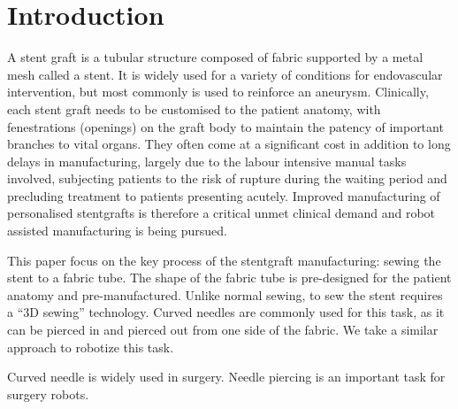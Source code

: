 \section{Introduction}


A stent graft is a tubular structure composed of fabric supported by a metal mesh called a stent. It is widely used for a variety of conditions for endovascular intervention, but most commonly is used to reinforce an aneurysm.
Clinically, each stent graft needs to be customised to the patient anatomy, with fenestrations (openings) on the graft body to maintain the patency of important branches to vital organs. They often come at a significant cost in addition to long delays in manufacturing, largely due to the labour intensive manual tasks involved, subjecting patients to the risk of rupture during the waiting period and precluding treatment to patients presenting acutely. Improved manufacturing of personalised stentgrafts is therefore a critical unmet clinical demand and robot assisted manufacturing is being pursued.

This paper focus on the key process of the stentgraft manufacturing: sewing the stent to a fabric tube. The shape of the fabric tube is pre-designed for the patient anatomy and pre-manufactured. Unlike normal sewing, to sew the stent requires a ``3D sewing'' technology. Curved needles are commonly used for this task, as it can be pierced in and pierced out from one side of the fabric. We take a similar approach to robotize this task. 

Curved needle is widely used in surgery. Needle piercing is an important task for surgery robots. 
